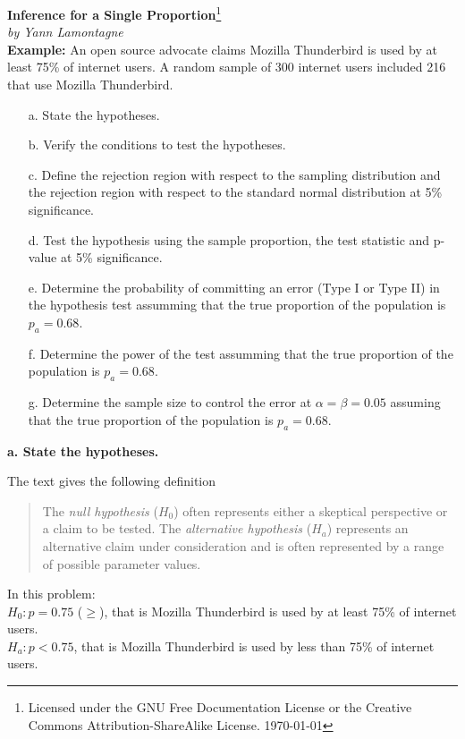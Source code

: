 \documentclass{article}
\begin{document}
\textbf{Inference for a Single Proportion}\footnote{Licensed under the GNU Free Documentation License or the Creative Commons Attribution-ShareAlike License. \today}\\
\textit{by Yann Lamontagne}\\

\textbf{Example:}
An open source advocate claims Mozilla Thunderbird is used by at least 75\% of 
internet users.  A random sample of 300 internet users included 216 that use Mozilla 
Thunderbird.  
\begin{enumerate} 
\item[a.] State the hypotheses.
\item[b.] Verify the conditions to test the hypotheses.
\item[c.] Define the rejection region with respect to the sampling distribution and the rejection region with respect to the standard normal distribution at 5\% significance.
\item[d.] Test the hypothesis using the sample proportion, the test statistic and p-value at 5\% significance.
\item[e.] Determine the probability of committing an error (Type I or Type II) in the hypothesis test assumming that the true proportion of the population is $p_a=0.68$.
\item[f.] Determine the power of the test assumming that the true proportion of the population is $p_a=0.68$.
\item[g.] Determine the sample size to control the error at $\alpha=\beta=0.05$ assuming that the true proportion of the population is $p_a=0.68$.
\end{enumerate}
\vspace{0.1in}

\textbf{a. State the hypotheses.}

The text gives the following definition

\begin{quote}
The \emph{null hypothesis} ($H_0$) often represents either a skeptical perspective 
or a claim to be tested. The \emph{alternative hypothesis} ($H_a$) represents an alternative 
claim under consideration and is often represented by a range of possible parameter values.\cite{OS}
\end{quote}

In this problem:\\
$H_0: p=0.75$ ($\geq$), that is Mozilla Thunderbird is used by at least 75\% of
internet users.\\
$H_a: p<0.75$, that is Mozilla Thunderbird is used by less than 75\% of internet users.\\
\end{document}
